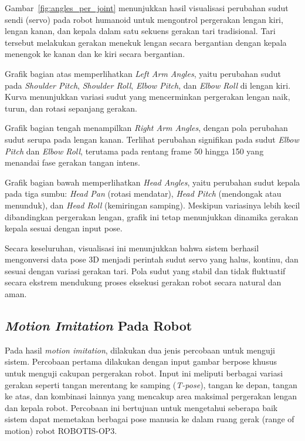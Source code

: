 Gambar~\ref{fig:angles_per_joint} menunjukkan hasil visualisasi perubahan sudut sendi (servo) pada robot humanoid untuk mengontrol pergerakan lengan kiri, lengan kanan, dan kepala dalam satu sekuens gerakan tari tradisional. Tari tersebut melakukan gerakan menekuk lengan secara bergantian dengan kepala menengok ke kanan dan ke kiri secara bergantian.

Grafik bagian atas memperlihatkan \emph{Left Arm Angles}, yaitu perubahan sudut pada \emph{Shoulder Pitch}, \emph{Shoulder Roll}, \emph{Elbow Pitch}, dan \emph{Elbow Roll} di lengan kiri. Kurva menunjukkan variasi sudut yang mencerminkan pergerakan lengan naik, turun, dan rotasi sepanjang gerakan.

Grafik bagian tengah menampilkan \emph{Right Arm Angles}, dengan pola perubahan sudut serupa pada lengan kanan. Terlihat perubahan signifikan pada sudut \emph{Elbow Pitch} dan \emph{Elbow Roll}, terutama pada rentang frame 50 hingga 150 yang menandai fase gerakan tangan intens.

Grafik bagian bawah memperlihatkan \emph{Head Angles}, yaitu perubahan sudut kepala pada tiga sumbu: \emph{Head Pan} (rotasi mendatar), \emph{Head Pitch} (mendongak atau menunduk), dan \emph{Head Roll} (kemiringan samping). Meskipun variasinya lebih kecil dibandingkan pergerakan lengan, grafik ini tetap menunjukkan dinamika gerakan kepala sesuai dengan input pose.

Secara keseluruhan, visualisasi ini menunjukkan bahwa sistem berhasil mengonversi data pose 3D menjadi perintah sudut servo yang halus, kontinu, dan sesuai dengan variasi gerakan tari. Pola sudut yang stabil dan tidak fluktuatif secara ekstrem mendukung proses eksekusi gerakan robot secara natural dan aman.


\subsection{\textit{Motion Imitation} Pada Robot}

Pada hasil \textit{motion imitation}, dilakukan dua jenis percobaan untuk menguji sistem. Percobaan pertama dilakukan dengan input gambar berpose khusus untuk menguji cakupan pergerakan robot. Input ini meliputi berbagai variasi gerakan seperti tangan merentang ke samping (\textit{T-pose}), tangan ke depan, tangan ke atas, dan kombinasi lainnya yang mencakup area maksimal pergerakan lengan dan kepala robot. Percobaan ini bertujuan untuk mengetahui seberapa baik sistem dapat memetakan berbagai pose manusia ke dalam ruang gerak (range of motion) robot ROBOTIS-OP3.

